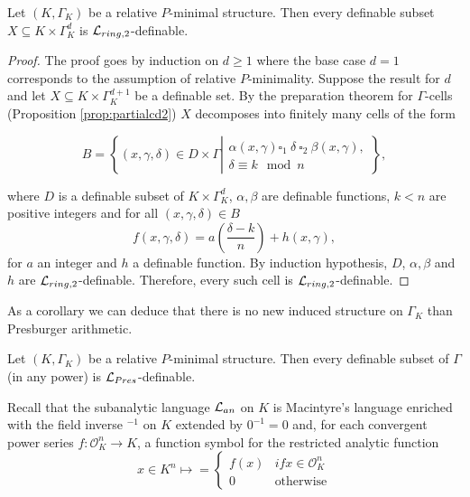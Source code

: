 \begin{prop}\label{l=1} Let $(K,\Gamma_K)$ be a relative $P$-minimal structure. Then every definable subset $X\subseteq K\times\Gamma_K^d$ is $\mathcal{L}_{ring,2}$-definable. 
\end{prop}

\begin{proof}

The proof goes by induction on $d\geq 1$ where the base case $d=1$ corresponds to the assumption of relative $P$-minimality. Suppose the result for $d$ and let $X\subseteq K\times \Gamma_K^{d+1}$ be a definable set. By the preparation theorem for $\Gamma$-cells (Proposition \ref{prop:partialcd2}) $X$ decomposes into finitely many cells of the form 

\[B= \left\{(x,\gamma,\delta)\in D\times\Gamma \left|\begin{array}{l} \alpha(x,\gamma) \square_1 \ \delta \ \square_2 \ \beta(x,\gamma), \\
\delta \equiv k\mod n \end{array}\right\}\right.,\]

where $D$ is a definable subset of $K\times\Gamma_K^d$, $\alpha,\beta$ are definable functions, $k<n$ are positive integers and for all $(x,\gamma,\delta)\in B$
\[f(x,\gamma,\delta) = a \left(\frac{\delta -k}{n}\right) + h(x,\gamma),\]
for $a$ an integer and $h$ a definable function. By induction hypothesis, $D$, $\alpha,\beta$ and $h$ are $\mathcal{L}_{ring,2}$-definable. Therefore, every such cell is $\mathcal{L}_{ring,2}$-definable. 
\end{proof}

As a corollary we can deduce that there is no new induced structure on $\Gamma_K$ than Presburger arithmetic. 

\begin{cor} Let $(K,\Gamma_K)$ be a relative $P$-minimal structure. Then every definable subset of $\Gamma$ (in any power) is $\mathcal{L}_{Pres}$-definable.   
\end{cor}

Recall that the subanalytic language $\mathcal{L}_{an}$ on $K$ is Macintyre’s language enriched with the field inverse $^{-1}$ on $K$ extended by $0^{-1}=0$ and, for each convergent power series $f: \mathcal{O}_K^n\to K$, a function symbol for the restricted analytic function
\begin{equation}
x\in K^n\mapsto=
\begin{cases}
f(x) & if x\in \mathcal{O}_K^n\\
0 & \text{otherwise}
\end{cases}
\label{eq:subanalytic}
\end{equation}

